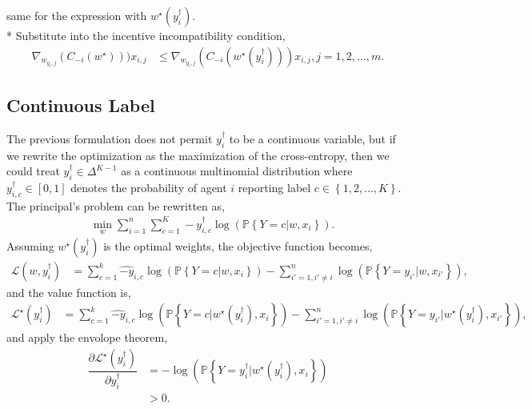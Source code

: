 \documentclass{article}
\begin{document}
same for the expression with $w^\star \left(y^{\dagger}_{i}\right)$.
\\* Substitute into the incentive incompatibility condition,
\begin{align*}
\nabla _{w_{y_{i} ,j}} \left(C_{-i}\left(w^\star \right)\right)) x_{i,j} &\leq  \nabla _{w_{y_{i} ,j}} \left(C_{-i}\left(w^\star \left(y^{\dagger}_{i}\right)\right)\right) x_{i,j}, j = 1, 2, ..., m. 
\end{align*}


\subsection{Continuous Label}
The previous formulation does not permit $y^{\dagger}_{i}$ to be a continuous variable, but if we rewrite the optimization as the maximization of the cross-entropy, then we could treat $y^{\dagger}_{i} \in \Delta^{K-1}$ as a continuous multinomial distribution where $y^{\dagger}_{i,c} \in \left[0, 1\right]$ denotes the probability of agent $i $ reporting label $c \in \left\{1, 2, ..., K\right\}$. The principal's problem can be rewritten as,
\begin{align*}
&\displaystyle\min_{w} \displaystyle\sum_{i=1}^{n} \displaystyle\sum_{c=1}^{K} -y^{\dagger}_{i,c} \log\left(\mathbb{P}\left\{Y = c | w, x_{i}\right\}\right).
\end{align*}
Assuming $w^\star \left(y^{\dagger}_{i}\right)$ is the optimal weights, the objective function becomes,
\begin{align*}
\mathcal{L}\left(w, y^{\dagger}_{i}\right) &= \displaystyle\sum_{c=1}^{k} \hat{-y}_{i,c} \log\left(\mathbb{P}\left\{Y = c | w, x_{i}\right\}\right) - \displaystyle\sum_{i' =1, i' \neq  i}^{n} \log\left(\mathbb{P}\left\{Y = y_{i'} | w, x_{i'}\right\}\right),
\end{align*}
and the value function is,
\begin{align*}
\mathcal{L}^\star \left(y^{\dagger}_{i}\right) &= \displaystyle\sum_{c=1}^{k} \hat{-y}_{i,c} \log\left(\mathbb{P}\left\{Y = c | w^\star \left(y^{\dagger}_{i}\right), x_{i}\right\}\right) - \displaystyle\sum_{i' =1, i' \neq  i}^{n} \log\left(\mathbb{P}\left\{Y = y_{i'} | w^\star \left(y^{\dagger}_{i}\right), x_{i'}\right\}\right),
\end{align*}
and apply the envolope theorem,
\begin{align*}
\dfrac{\partial \mathcal{L}^\star \left(y^{\dagger}_{i}\right)}{\partial y^{\dagger}_{i}} &= -\log\left(\mathbb{P}\left\{Y = y^{\dagger}_{i} | w^\star \left(y^{\dagger}_{i}\right), x_{i}\right\}\right)
\\ &> 0.
\end{align*}
\end{document}
